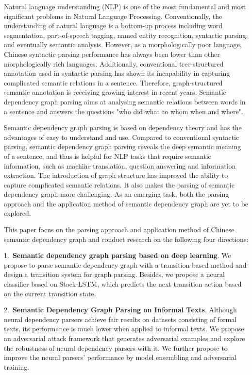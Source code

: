 \begin{eabstract}

Natural language understanding (NLP) is one of the most fundamental and most significant problems in Natural Language Processing. 
Conventionally, the understanding of natural language is a bottom-up process including word segmentation, part-of-speech tagging, named entity recognition, syntactic parsing, and eventually semantic analysis. 
However, as a morphologically poor language, Chinese syntactic parsing performance has always been lower than other morphologically rich languages. 
Additionally, conventional tree-structured annotation used in syntactic parsing has shown its incapability in capturing complicated semantic relations in a sentence. 
Therefore, graph-structured semantic annotation is receiving growing interest in recent years. 
Semantic dependency graph parsing aims at analysing semantic relations between words in a sentence and answers the questions "who did what to whom when and where". 

Semantic dependency graph parsing is based on dependency theory and has the advantages of easy to understand and use. 
Compared to conventional syntactic parsing, semantic dependency graph parsing reveals the deep semantic meaning of a sentence, and thus is helpful for NLP tasks that require semantic information, such as machine translation, question answering and information extraction. 
The introduction of graph structure has improved the ability to capture complicated semantic relations. 
It also makes the parsing of semantic dependency graph more challenging. 
As an emerging task, both the parsing approach and the application method of semantic dependency graph are yet to be explored. 

This paper focus on the parsing approach and application method of Chinese semantic dependency graph and conduct research on the following four directions: 

1.\ \textbf{Semantic dependency graph parsing based on deep learning}. 
We propose to parse semantic dependency graph with a transition-based method and design a transition system for graph parsing. 
Besides, we propose a neural classifier based on Stack-LSTM, which predicts the next transition action based on the current transition state. 

2.\ \textbf{Semantic Dependency Graph Parsing on Informal Texts}. 
Although neural dependency parsers achieve fair results on datasets consisting of formal texts, its performance is much lower when applied to informal texts. 
We propose an adversarial attack framework that generates adversarial examples and explore the robustness of neural dependency parsers with it. 
We further propose to improve the neural parsers' performance by model ensembling and adversarial training. 


\end{eabstract}
